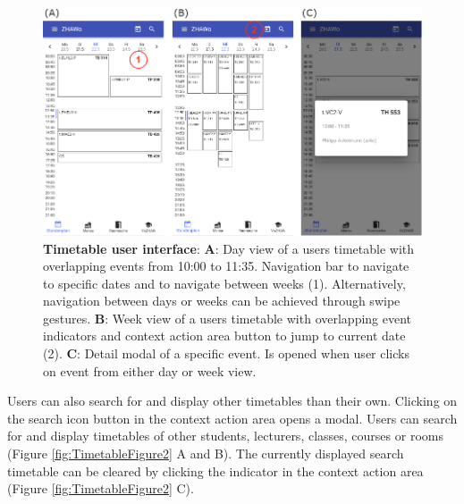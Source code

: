 \begin{markdown}
\begin{figure}[H]
  \includegraphics[width=16cm, center]{./figures/timetable_figure1.png}
  \captionsetup{width=15.5cm}
  \caption[Timetable user interface]{\textbf{Timetable user interface}: \textbf{A}: Day view of a users timetable with overlapping events from 10:00 to 11:35. Navigation bar to navigate to specific dates and to navigate between weeks (1). Alternatively, navigation between days or weeks can be achieved through swipe gestures. \textbf{B}: Week view of a users timetable with overlapping event indicators and context action area button to jump to current date (2). \textbf{C}: Detail modal of a specific event. Is opened when user clicks on event from either day or week view.}
  \label{fig:TimetableFigure1}
\end{figure}
Users can also search for and display other timetables than their own. Clicking on the search icon button in the context action area opens a modal. Users can search for and display timetables of other students, lecturers, classes, courses or rooms (Figure \ref{fig:TimetableFigure2} A and B). The currently displayed search timetable can be cleared by clicking the indicator in the context action area (Figure \ref{fig:TimetableFigure2} C).


\end{markdown}
